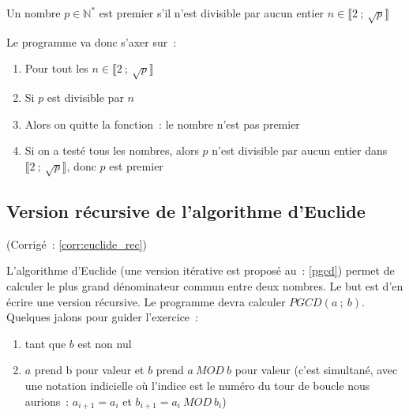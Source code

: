 		Un nombre $p \in \mathbb{N}^*$ est premier s'il n'est divisible par aucun entier $n \in \llbracket 2~;\ \sqrt{p} \rrbracket$
		
		Le programme va donc s'axer sur~:
		\begin{enumerate}
			\item Pour tout les $n \in \llbracket 2~;\ \sqrt{p} \rrbracket$
			\item Si $p$ est divisible par $n$
			\item Alors on quitte la fonction~: le nombre n'est pas premier
			\item Si on a testé tous les nombres, alors $p$ n'est divisible par aucun entier dans $\llbracket 2~;\ \sqrt{p} \rrbracket$, donc $p$ est premier
		\end{enumerate}
	
	\subsection{Version récursive de l'algorithme d'Euclide} \label{appl:euclide_rec} (Corrigé~: \ref{corr:euclide_rec})
	
		L'algorithme d'Euclide (une version itérative est proposé au~: \ref{pgcd}) permet de calculer le plus grand dénominateur commun entre deux nombres. Le but est d'en écrire une version récursive. Le programme devra calculer $PGCD(a~;\ b)$. Quelques jalons pour guider l'exercice~:
		\begin{enumerate}
			\item tant que $b$ est non nul
			\item $a$ prend b pour valeur et $b$ prend $a\ MOD\ b$ pour valeur (c'est simultané, avec une notation indicielle où l'indice est le numéro du tour de boucle nous aurions~: $a_{i+1} = a_i$ et $b_{i+1} = a_i\ MOD\ b_i$)
		\end{enumerate}

		
			
		
		
